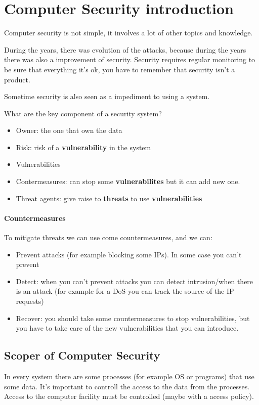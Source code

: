 \section{Computer Security introduction}

Computer security is not simple, it involves a lot of other topics and
knowledge.

During the years, there was evolution of the attacks, because during the years
there was also a improvement of security. Security requires regular monitoring
to be sure that everything it's ok, you have to remember that security isn't a
product.

Sometime security is also seen as a impediment to using a system.

What are the key component of a security system?
\begin{itemize}
  \item Owner: the one that own the data
  \item Risk: risk of a \textbf{vulnerability} in the system
  \item Vulnerabilities
  \item Contermeasures: can stop some \textbf{vulnerabilites} but it can add new
one.
  \item Threat agents: give raise to \textbf{threats} to use
\textbf{vulnerabilities}
\end{itemize}

\paragraph*{Countermeasures} To mitigate threats we can use come
countermeasures, and we can:
\begin{itemize}
  \item Prevent attacks (for example blocking some IPs). In some case you can't
prevent
  \item Detect: when you can't prevent attacks you can detect intrusion/when
there is an attack (for example for a DoS you can track the source of the IP
requests)
  \item Recover: you should take some countermeasures to stop vulnerabilities,
but you have to take care of the new vulnerabilities that you can introduce.
\end{itemize}

\subsection{Scoper of Computer Security}
In every system there are some processes (for example OS or programs) that use
some data. It's important to controll the access to the data from the
processes. Access to the computer facility must be controlled (maybe with a
access policy).

